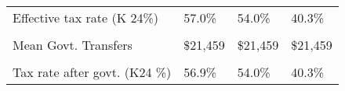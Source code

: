 \documentclass[12pt]{article}
\begin{document}
\begin{table}[]
\begin{tabular}{llll}
Effective tax rate (K 24\%)       & 57.0\%                       & 54.0\%        & 40.3\%        \\
                                  &                              &               &               \\
Mean Govt. Transfers              & \$21,459                     & \$21,459      & \$21,459      \\
                                  &                              &               &               \\
Tax rate after govt. (K24 \%)     & 56.9\%                       & 54.0\%        & 40.3\%       \\ \hline
\end{tabular}
\end{table}

\begin{landscape}


\end{landscape}
\end{document}

